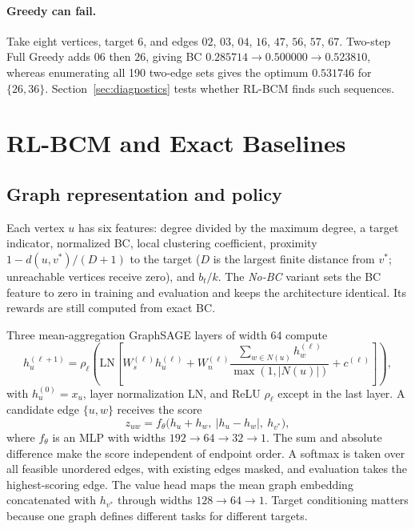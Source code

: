 \documentclass[runningheads]{llncs}
\newcommand{\rlbcm}{RL-BCM}
\begin{document}
\paragraph{Greedy can fail.}
Take eight vertices, target $6$, and edges $02$, $03$, $04$, $16$, $47$,
$56$, $57$, $67$. Two-step Full Greedy adds $06$ then $26$, giving BC
$0.285714\to0.500000\to0.523810$, whereas enumerating all 190 two-edge sets
gives the optimum $0.531746$ for $\{26,36\}$. Section~\ref{sec:diagnostics}
tests whether \rlbcm{} finds such sequences.

\section{\rlbcm{} and Exact Baselines}
\label{sec:method}
\subsection{Graph representation and policy}
Each vertex $u$ has six features: degree divided by the maximum degree, a
target indicator, normalized BC, local clustering coefficient, proximity
$1-d(u,v^*)/(D+1)$ to the target ($D$ is the largest finite distance from
$v^*$; unreachable vertices receive zero), and $b_t/k$. The \emph{No-BC}
variant sets the BC feature to zero in training and evaluation and keeps the
architecture identical. Its rewards are still computed from exact BC.

Three mean-aggregation GraphSAGE layers of width 64 compute
\begin{equation}
 h_u^{(\ell+1)}=\rho_\ell\!\left(\mathrm{LN}\!\left[
 W_s^{(\ell)}h_u^{(\ell)}+
 W_n^{(\ell)}\frac{\sum_{w\in N(u)}h_w^{(\ell)}}{\max(1,|N(u)|)}
 +c^{(\ell)}\right]\right),
\end{equation}
with $h_u^{(0)}=x_u$, layer normalization LN, and ReLU $\rho_\ell$ except in
the last layer. A candidate edge $\{u,w\}$ receives the score
\begin{equation}
 z_{uw}=f_\theta\bigl(h_u+h_w,\ |h_u-h_w|,\ h_{v^*}\bigr),
 \label{eq:score}
\end{equation}
where $f_\theta$ is an MLP with widths $192\to64\to32\to1$. The sum and
absolute difference make the score independent of endpoint order. A softmax
is taken over all feasible unordered edges, with existing edges masked, and
evaluation takes the highest-scoring edge. The value head maps the mean
graph embedding concatenated with $h_{v^*}$ through widths $128\to64\to1$.
Target conditioning matters because one graph defines different tasks for
different targets.
\end{document}

